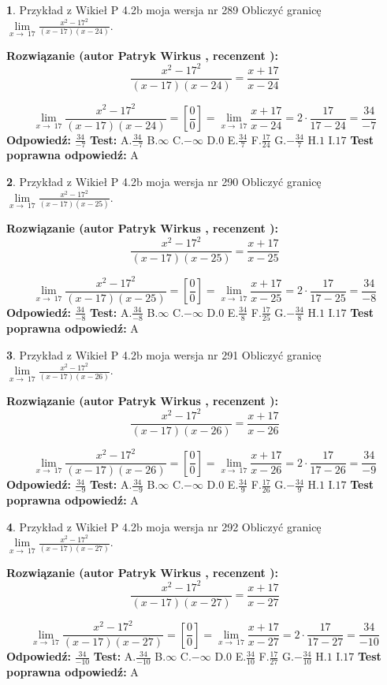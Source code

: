 \documentclass[12pt, a4paper]{article}
\theoremstyle{definition} %
\newtheorem{zad}{}
\newcommand{\zadStart}[1]{\begin{zad}#1\newline}
\newcommand{\zadStop}{\end{zad}}
\newcommand{\rozwStart}[2]{\noindent \textbf{Rozwiązanie (autor #1 , recenzent #2): }\newline}
\newcommand{\rozwStop}{\newline}
\newcommand{\odpStart}{\noindent \textbf{Odpowiedź:}\newline}
\newcommand{\odpStop}{\newline}
\newcommand{\testStart}{\noindent \textbf{Test:}\newline}
\newcommand{\testStop}{\newline}
\newcommand{\kluczStart}{\noindent \textbf{Test poprawna odpowiedź:}\newline}
\newcommand{\kluczStop}{\newline}
\begin{document}
\zadStart{Przykład z Wikieł P 4.2b moja wersja nr 289}
Obliczyć granicę $\lim\limits_{x\to\ 17}\frac{x^{2}-17^{2}}{(x-17)(x-24)}$.
\zadStop
\rozwStart{Patryk Wirkus}{}
$$\frac{x^{2}-17^{2}}{(x-17)(x-24)}=\frac{x+17}{x-24}$$

$$\lim\limits_{x\to\ 17}\frac{x^{2}-17^{2}}{(x-17)(x-24)}=[\frac{0}{0}]=\lim\limits_{x\to\ 17}\frac{x+17}{x-24}=2 \cdot \frac{17}{17-24} = \frac{34}{-7}$$
\rozwStop
\odpStart
$\frac{34}{-7}$
\odpStop
\testStart
A.$\frac{34}{-7}$
B.$\infty$
C.$-\infty$
D.$0$
E.$\frac{34}{7}$
F.$\frac{17}{24}$
G.$-\frac{34}{7}$
H.$1$
I.$17$
\testStop
\kluczStart
A
\kluczStop



\zadStart{Przykład z Wikieł P 4.2b moja wersja nr 290}
Obliczyć granicę $\lim\limits_{x\to\ 17}\frac{x^{2}-17^{2}}{(x-17)(x-25)}$.
\zadStop
\rozwStart{Patryk Wirkus}{}
$$\frac{x^{2}-17^{2}}{(x-17)(x-25)}=\frac{x+17}{x-25}$$

$$\lim\limits_{x\to\ 17}\frac{x^{2}-17^{2}}{(x-17)(x-25)}=[\frac{0}{0}]=\lim\limits_{x\to\ 17}\frac{x+17}{x-25}=2 \cdot \frac{17}{17-25} = \frac{34}{-8}$$
\rozwStop
\odpStart
$\frac{34}{-8}$
\odpStop
\testStart
A.$\frac{34}{-8}$
B.$\infty$
C.$-\infty$
D.$0$
E.$\frac{34}{8}$
F.$\frac{17}{25}$
G.$-\frac{34}{8}$
H.$1$
I.$17$
\testStop
\kluczStart
A
\kluczStop



\zadStart{Przykład z Wikieł P 4.2b moja wersja nr 291}
Obliczyć granicę $\lim\limits_{x\to\ 17}\frac{x^{2}-17^{2}}{(x-17)(x-26)}$.
\zadStop
\rozwStart{Patryk Wirkus}{}
$$\frac{x^{2}-17^{2}}{(x-17)(x-26)}=\frac{x+17}{x-26}$$

$$\lim\limits_{x\to\ 17}\frac{x^{2}-17^{2}}{(x-17)(x-26)}=[\frac{0}{0}]=\lim\limits_{x\to\ 17}\frac{x+17}{x-26}=2 \cdot \frac{17}{17-26} = \frac{34}{-9}$$
\rozwStop
\odpStart
$\frac{34}{-9}$
\odpStop
\testStart
A.$\frac{34}{-9}$
B.$\infty$
C.$-\infty$
D.$0$
E.$\frac{34}{9}$
F.$\frac{17}{26}$
G.$-\frac{34}{9}$
H.$1$
I.$17$
\testStop
\kluczStart
A
\kluczStop



\zadStart{Przykład z Wikieł P 4.2b moja wersja nr 292}
Obliczyć granicę $\lim\limits_{x\to\ 17}\frac{x^{2}-17^{2}}{(x-17)(x-27)}$.
\zadStop
\rozwStart{Patryk Wirkus}{}
$$\frac{x^{2}-17^{2}}{(x-17)(x-27)}=\frac{x+17}{x-27}$$

$$\lim\limits_{x\to\ 17}\frac{x^{2}-17^{2}}{(x-17)(x-27)}=[\frac{0}{0}]=\lim\limits_{x\to\ 17}\frac{x+17}{x-27}=2 \cdot \frac{17}{17-27} = \frac{34}{-10}$$
\rozwStop
\odpStart
$\frac{34}{-10}$
\odpStop
\testStart
A.$\frac{34}{-10}$
B.$\infty$
C.$-\infty$
D.$0$
E.$\frac{34}{10}$
F.$\frac{17}{27}$
G.$-\frac{34}{10}$
H.$1$
I.$17$
\testStop
\kluczStart
A
\kluczStop
\end{document}
